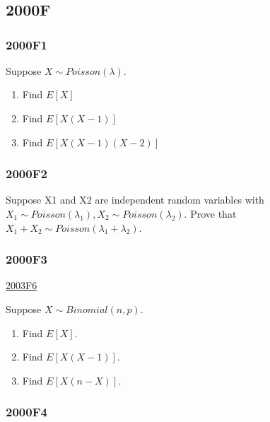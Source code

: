 \documentclass[6pt,twocolumn,Portrait]{article}
\title{}
\author{}
\date{}
\begin{document}
\hypertarget{section}{%
\section{}\label{section}}

\hypertarget{f}{%
\subsection{2000F}\label{f}}

\hypertarget{f1}{%
\subsubsection{2000F1}\label{f1}}

Suppose \(X\sim Poisson(\lambda)\).

\begin{enumerate}
\def\labelenumi{\Alph{enumi})}
\item
  Find \(E[X]\)
\item
  Find \(E[X(X-1)]\)
\item
  Find \(E[X(X-1)(X-2)]\)
\end{enumerate}

\hypertarget{f2}{%
\subsubsection{2000F2}\label{f2}}

Suppose X1 and X2 are independent random variables with
\(X_1\sim Poisson(\lambda_1),X_2\sim Poisson(\lambda_2)\). Prove that
\(X_1+X_2\sim Poisson(\lambda_1+\lambda_2)\).

\hypertarget{f3}{%
\subsubsection{2000F3}\label{f3}}

\protect\hyperlink{f6-1}{2003F6}

Suppose \(X\sim Binomial(n,p)\).

\begin{enumerate}
\def\labelenumi{\Alph{enumi})}
\item
  Find \(E[X]\).
\item
  Find \(E[X(X-1)]\).
\item
  Find \(E[X(n-X)]\).
\end{enumerate}

\hypertarget{f4}{%
\subsubsection{2000F4}\label{f4}}
\end{document}
